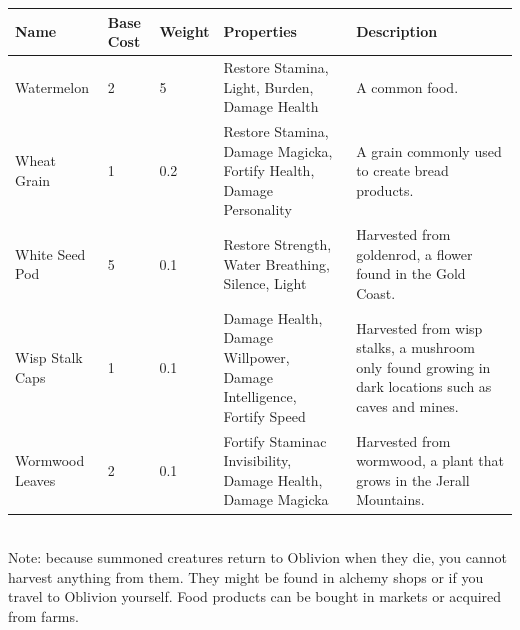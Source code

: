 \documentclass[12pt]{book}
\begin{document}
\begin{tabular}{|p{}|p{}|p{}|p{}|p{}|}
\hline
Name & Base Cost & Weight & Properties & Description\\ \hline
Watermelon & 2 & 5 & Restore Stamina, Light, Burden, Damage Health & A common food.\\ \hline
Wheat Grain & 1 & 0.2 & Restore Stamina, Damage Magicka, Fortify Health, Damage Personality & A grain commonly used to create bread products.\\ \hline
White Seed Pod & 5 & 0.1 & Restore Strength, Water Breathing, Silence, Light & Harvested from goldenrod, a flower found in the Gold Coast.\\ \hline
Wisp Stalk Caps & 1 & 0.1 & Damage Health, Damage Willpower, Damage Intelligence, Fortify Speed & Harvested from wisp stalks, a mushroom only found growing in dark locations such as caves and mines.\\ \hline
Wormwood Leaves & 2 & 0.1 & Fortify Staminac Invisibility, Damage Health, Damage Magicka & Harvested from wormwood, a plant that grows in the Jerall Mountains.\\ \hline
\end{tabular}\\

Note: because summoned creatures return to Oblivion when they die, you cannot harvest anything from them. They might be found in alchemy shops or if you travel to Oblivion yourself. Food products can be bought in markets or acquired from farms.
\end{document}
